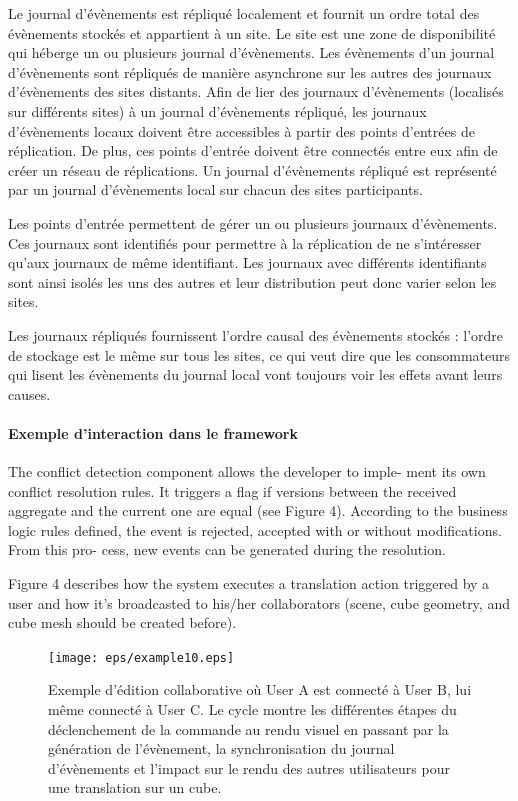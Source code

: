 Le journal d'évènements est répliqué localement et fournit un ordre total des 
évènements stockés et appartient à un site. 
Le site est une zone de disponibilité qui héberge un ou plusieurs 
journal d'évènements. Les évènements d'un journal d'évènements sont 
répliqués de manière asynchrone sur les autres des journaux d'évènements 
des sites distants. 
Afin de lier des journaux d'évènements (localisés sur différents sites) à un journal 
d'évènements répliqué, les 
journaux d'évènements locaux doivent être accessibles à partir des points 
d'entrées de réplication. De plus, ces points d'entrée doivent être 
connectés entre eux afin de créer un réseau de réplications. 
Un journal d'évènements répliqué est représenté par un journal d'évènements local 
sur chacun des sites participants.


Les points d'entrée permettent de gérer un ou plusieurs journaux d'évènements. 
Ces journaux sont identifiés pour permettre à la réplication de ne s'intéresser 
qu'aux journaux de même identifiant. 
Les journaux avec différents identifiants sont ainsi isolés les uns des autres et 
leur distribution peut donc varier selon les sites.

Les journaux répliqués fournissent l'ordre causal des évènements stockés : l'ordre 
de stockage est le même sur tous les sites, ce qui veut dire que les 
consommateurs qui lisent les évènements du journal local vont toujours voir les 
effets avant leurs causes.



\paragraph{Exemple d'interaction dans le framework}
The conflict detection component allows the developer to imple- ment its own 
conflict resolution rules. It triggers a flag if versions between the received 
aggregate and the current one are equal (see Figure 4). According to the business 
logic rules defined, the event is rejected, accepted with or without modifications. 
From this pro- cess, new events can be generated during the resolution.

Figure 4 describes how the system executes a translation action triggered by a 
user and how it’s broadcasted to his/her collaborators (scene, cube geometry, and 
cube mesh should be created before). 
\begin{figure}[ht]
	\centering
	\texttt{[image: eps/example10.eps]}
	\caption[Flux de la collaboration dans le framework 3DEvent entre 3 
	utilisateurs]{Exemple d'édition collaborative où User A est connecté à User  B, 
	lui 
	même connecté à User C. Le cycle montre les différentes étapes du 
	déclenchement de la commande au rendu visuel en passant par la génération 
	de l'évènement, la 
	synchronisation du journal d'évènements et l'impact sur le rendu des autres 
	utilisateurs pour une translation sur un cube.}\label{fig:cqrs-example}
\end{figure}

